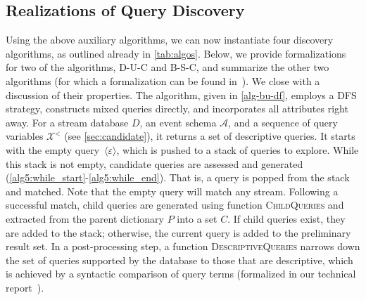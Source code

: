 \subsection{Realizations of Query Discovery}
\label{sec:realizations}
Using the above auxiliary algorithms, we can now instantiate four
discovery algorithms, as outlined already in \autoref{tab:algos}. Below, we
provide formalizations for two of the algorithms, D-U-C and B-S-C, and
summarize the other two algorithms (for which a formalization can be found
in~\cite{disces_TR}). We close with a
discussion of their properties.
The algorithm, given in \autoref{alg-bu-df},
employs a DFS strategy, constructs mixed queries directly, and incorporates
all attributes right away.
For a stream
database $D$, an event schema
$\mathcal{A}$, and
a sequence of query variables $\mathcal{X}^<$ (see
\autoref{sec:candidate}),
it returns a set of descriptive queries. 
It starts with the
empty query~$\langle \varepsilon\rangle$, which is pushed to a stack of
queries to explore.
While this stack is not empty, candidate queries are assessed and generated
(\autoref{alg5:while_start}-\ref{alg5:while_end}). That is, a query is
popped from
the stack and matched. Note
that the
empty query will match any stream. Following a successful match, child
queries are
generated using function \textsc{ChildQueries} and extracted from the parent
dictionary $P$ into a set $C$. If child queries exist, they are added to the
stack;
otherwise, the current query is added to the preliminary result set.
In a post-processing step, a function \textsc{DescriptiveQueries} narrows
down the set of queries supported by the database to those that are
descriptive, which
is achieved by a syntactic comparison of query terms (formalized in our
technical report~\cite{disces_TR}).
